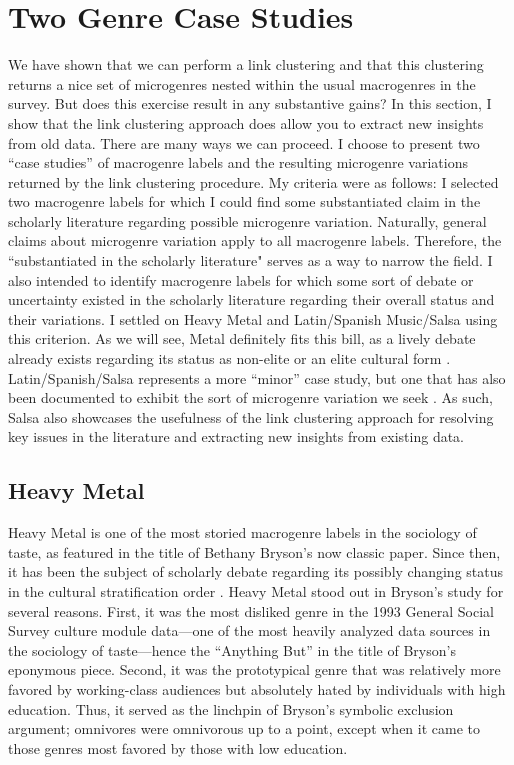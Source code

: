 \documentclass[a4paper,12pt]{extarticle}
\begin{document}
\section{Two Genre Case Studies}
We have shown that we can perform a link clustering and that this clustering returns a nice set of microgenres nested within the usual macrogenres in the survey. But does this exercise result in any substantive gains? In this section, I show that the link clustering approach does allow you to extract new insights from old data. There are many ways we can proceed. I choose to present two ``case studies'' of macrogenre labels and the resulting microgenre variations returned by the link clustering procedure. My criteria were as follows: I selected two macrogenre labels for which I could find some substantiated claim in the scholarly literature regarding possible microgenre variation. Naturally, general claims about microgenre variation apply to all macrogenre labels. Therefore, the ``substantiated in the scholarly literature" serves as a way to narrow the field. I also intended to identify macrogenre labels for which some sort of debate or uncertainty existed in the scholarly literature regarding their overall status and their variations. I settled on Heavy Metal and Latin/Spanish Music/Salsa using this criterion. As we will see, Metal definitely fits this bill, as a lively debate already exists regarding its status as non-elite or an elite cultural form \citep{tampubolon2008revisiting}. Latin/Spanish/Salsa represents a more ``minor'' case study, but one that has also been documented to exhibit the sort of microgenre variation we seek \citep{bakk2013estimating}. As such, Salsa also showcases the usefulness of the link clustering approach for resolving key issues in the literature and extracting new insights from existing data.

\subsection{Heavy Metal}
Heavy Metal is one of the most storied macrogenre labels in the sociology of taste, as featured in the title of Bethany Bryson's \citeyearpar{bryson96} now classic paper. Since then, it has been the subject of scholarly debate regarding its possibly changing status in the cultural stratification order \citep{tampubolon2008revisiting, goldberg2011mapping, lizardo_skiles15}. Heavy Metal stood out in Bryson's study for several reasons. First, it was the most disliked genre in the 1993 General Social Survey culture module data---one of the most heavily analyzed data sources in the sociology of taste---hence the ``Anything But'' in the title of Bryson's eponymous piece. Second, it was the prototypical genre that was relatively more favored by working-class audiences but absolutely hated by individuals with high education. Thus, it served as the linchpin of Bryson's symbolic exclusion argument; omnivores were omnivorous up to a point, except when it came to those genres most favored by those with low education. 
\end{document}
